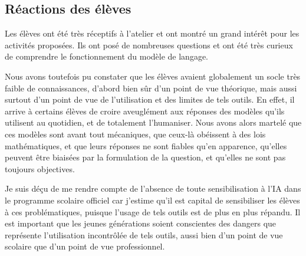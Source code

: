 \subsection{Réactions des élèves}
  Les élèves ont été très réceptifs à l'atelier et ont montré un grand intérêt pour les activités proposées. Ils ont posé de nombreuses questions et ont été très curieux de comprendre le fonctionnement du modèle de langage.  \par 
  Nous avons toutefois pu constater que les élèves avaient globalement un socle très faible de connaissances, d'abord bien sûr d'un point de vue théorique, mais aussi surtout d'un point de vue de l'utilisation et des limites de tels outils. En effet, il arrive à certains élèves de croire aveuglément aux réponses des modèles qu'ils utilisent au quotidien, et de totalement l'humaniser. Nous avons alors martelé que ces modèles sont avant tout mécaniques, que ceux-là obéissent à des lois mathématiques, et que leurs réponses ne sont fiables qu'en apparence, qu'elles peuvent être biaisées par la formulation de la question, et qu'elles ne sont pas toujours objectives. \par
 Je suis déçu de me rendre compte de l'absence de toute sensibilisation à l'IA dans le programme scolaire officiel car j'estime qu'il est capital de sensibiliser les élèves à ces problématiques, puisque l'usage de tels outils est de plus en plus répandu. Il est important que les jeunes générations soient conscientes des dangers que représente l'utilisation incontrôlée de tels outils, aussi bien d'un point de vue scolaire que d'un point de vue professionnel.
